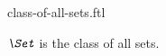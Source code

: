 \documentclass{stex}
\begin{document}
\begin{smodule}{class-of-all-sets.ftl}



\begin{definition}[forthel,id=ClassOfAllSetsDef,for=Set]
  $\emph{\Set}$ is the class of all sets.
\end{definition}

\end{smodule}
\end{document}
